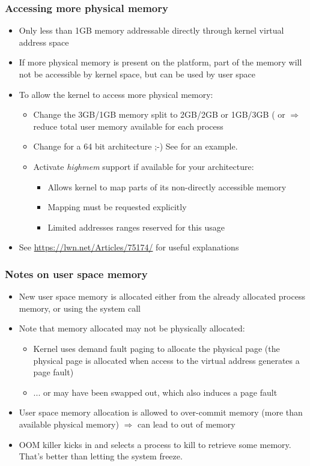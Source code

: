 \begin{frame}
  \frametitle{Accessing more physical memory}
  \begin{itemize}
  \item Only less than 1GB memory addressable directly through kernel
    virtual address space
  \item If more physical memory is present on the platform, part of
    the memory will not be accessible by kernel space, but can be used
    by user space
  \item To allow the kernel to access more physical memory:
    \begin{itemize}
    \item Change the 3GB/1GB memory split to 2GB/2GB or 1GB/3GB
      ( or 
      $\Rightarrow$ reduce total user memory available for each process
    \item Change for a 64 bit architecture ;-) See
       for an example.
    \item Activate \emph{highmem} support if available for your
      architecture:
      \begin{itemize}
      \item Allows kernel to map parts of its non-directly accessible
        memory
      \item Mapping must be requested explicitly
      \item Limited addresses ranges reserved for this usage
      \end{itemize}
    \end{itemize}
  \item See \url{https://lwn.net/Articles/75174/} for useful
    explanations
  \end{itemize}
\end{frame}

\begin{frame}
  \frametitle{Notes on user space memory}
  \begin{itemize}
  \item New user space memory is allocated either from the already
    allocated process memory, or using the  system call
  \item Note that memory allocated may not be physically allocated:
    \begin{itemize}
    \item Kernel uses demand fault paging to allocate the physical
      page (the physical page is allocated when access to the virtual
      address generates a page fault)
    \item ... or may have been swapped out, which also induces a page
      fault
    \end{itemize}
  \item User space memory allocation is allowed to over-commit memory
    (more than available physical memory) $\Rightarrow$ can lead to
    out of memory
  \item OOM killer kicks in and selects a process to kill to retrieve
    some memory.  That's better than letting the system freeze.
  \end{itemize}
\end{frame}


